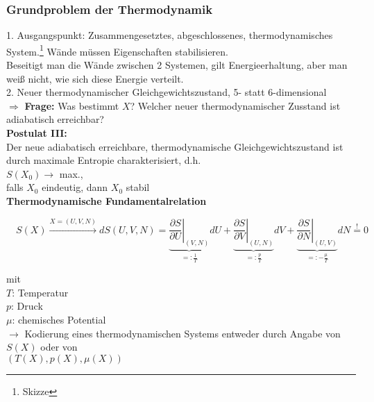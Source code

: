 \documentclass[10pt]{scrartcl}
\begin{document}
 \subsubsection{Grundproblem der Thermodynamik}
 1. Ausgangspunkt: Zusammengesetztes, abgeschlossenes, thermodynamisches System.\footnote{Skizze} Wände müssen Eigenschaften stabilisieren.\\
 Beseitigt man die Wände zwischen  2 Systemen, gilt Energieerhaltung, aber man weiß nicht, wie sich diese Energie verteilt.\\
 2. Neuer thermodynamischer Gleichgewichtszustand, 5- statt 6-dimensional\\
 $\Rightarrow$ \textbf{Frage:} Was bestimmt $X$? Welcher neuer thermodynamischer Zusstand ist adiabatisch erreichbar?\\
 \textbf{Postulat III:}\\
Der neue adiabatisch erreichbare, thermodynamische Gleichgewichtszustand ist durch maximale Entropie charakterisiert, d.h.\\
 $S(X_0) \rightarrow$  max.,\\ 
falls $X_0$ eindeutig, dann $X_0$ stabil\\
 \textbf{Thermodynamische Fundamentalrelation}
\begin{fleqn}
\begin{equation}
 \quad S(X) \xrightarrow{X=(U,V,N)} dS(U,V,N)= 
\underbrace{\left.\frac{\partial S}{\partial U}\right|_{(V,N)}}
  _{=:\frac{1}{T}} dU  + 
\underbrace{\left.\frac{\partial S}{\partial V}\right|_{(U,N)}}
  _{=:\frac{p}{T}} dV + 
\underbrace{\left.\frac{\partial S}{\partial N}\right|
  _{(U,V)}}_{=:-\frac{\mu}{T}} dN \stackrel{!}{=}0
\end{equation}
\end{fleqn}
mit\\
$T$: Temperatur\\
$p$: Druck\\
$\mu$: chemisches Potential\\
$\rightarrow$ Kodierung eines thermodynamischen Systems entweder durch Angabe von\\
$S(X)$ oder von \\
$(T(X),p(X),\mu(X))$ \\
\end{document}

